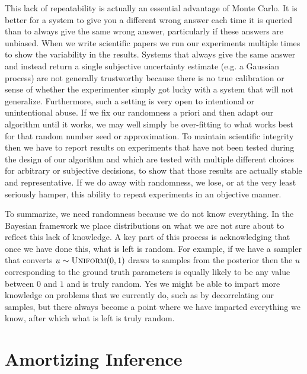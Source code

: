 This lack of repeatability is actually an essential advantage of Monte Carlo.  It is better for a system to give you
a different wrong answer each time it is queried than to always give the same wrong answer, particularly if these answers
are unbiased.  When we write scientific papers we run our experiments
multiple times to show the variability in the results.  Systems that always give the same answer and instead return
a single subjective uncertainty estimate (e.g. a Gaussian process) are not generally trustworthy because there is no
true calibration or sense of whether the experimenter simply got lucky with a system that will not generalize.  
Furthermore, such a setting is very open to intentional or unintentional abuse.  If we fix our randomness
a priori and then adapt our algorithm until it works, we may well simply be over-fitting to what works best for that
random number seed or approximation. To maintain scientific integrity then we have to report results on 
experiments that have not been
tested during the design of our algorithm and which are tested with multiple different choices for arbitrary or subjective
decisions, to show that those results are actually stable and representative.  If we do away with randomness, we lose, or at the very least
seriously hamper, this ability to repeat experiments in an objective manner.

To summarize, we need randomness because we do not know everything.  In the Bayesian framework we place distributions
on what we are not sure about to reflect this lack of knowledge.  A key part of this process is acknowledging that once we
have done this, what is left is random.   For example, if we have a sampler that converts $u\sim\textsc{Uniform}(0,1)$ draws
to samples from the posterior then the $u$ corresponding to the ground truth parameters is equally likely to be any value
between $0$ and $1$ and is truly random.
Yes we might be able to impart more knowledge on
problems that we currently do, such as by decorrelating our samples, but there always become a point where we have
imparted everything we know, after which what is left is truly random.


\section{Amortizing Inference}

